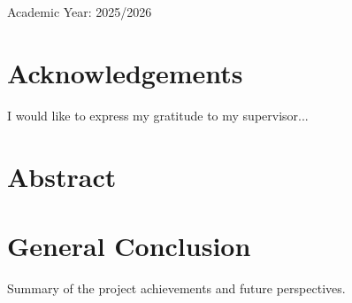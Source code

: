 \documentclass[12pt,a4paper,oneside]{report}
\begin{document}
\begin{center}
    Academic Year: 2025/2026
\end{center}

\newpage

\chapter*{Acknowledgements}
\thispagestyle{empty}
I would like to express my gratitude to my supervisor...

\newpage
\chapter*{Abstract}
\thispagestyle{empty}


\newpage
{}
\tableofcontents
\listoffigures
\listoftables






\chapter*{General Conclusion}
Summary of the project achievements and future perspectives.



\end{document}

